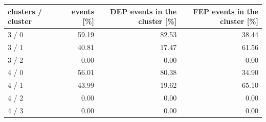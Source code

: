 \begin{tabular}{lrrr}
\hline
clusters / cluster & events [\%] & DEP events in the cluster [\%] & FEP events in the cluster [\%] \\
\hline
3 / 0 & 59.19 & 82.53 & 38.44 \\
3 / 1 & 40.81 & 17.47 & 61.56 \\
3 / 2 & 0.00 & 0.00 & 0.00 \\
4 / 0 & 56.01 & 80.38 & 34.90 \\
4 / 1 & 43.99 & 19.62 & 65.10 \\
4 / 2 & 0.00 & 0.00 & 0.00 \\
4 / 3 & 0.00 & 0.00 & 0.00 \\
\hline
\end{tabular}
